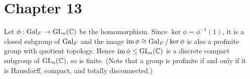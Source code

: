 \newpage
\section{Chapter 13}

\begin{problem} \notfinish
\end{problem}

\begin{problem} \notfinish
\end{problem}

\begin{problem} \notfinish
\end{problem}

\begin{problem}
Let $\phi : \operatorname{\mathrm{Gal}}_F \to \operatorname{\mathrm{GL}}_n(\mathbb{C})$ be the homomorphism.
Since $\ker \phi = \phi^{-1}(1)$, it is a closed subgroup of $\operatorname{\mathrm{Gal}}_F$ and the image $\mathrm{im\,}\phi \cong \operatorname{\mathrm{Gal}}_F / \ker \phi$
is also a profinite group with quotient topology.
Hence $\mathrm{im\,}\phi \leq \operatorname{\mathrm{GL}}_n(\mathbb{C})$ is a discrete compact subgroup of $\operatorname{\mathrm{GL}}_n(\mathbb{C})$, so is finite.
(Note that a group is profinite if and only if it is Hausdorff, compact, and totally disconnected.)
\end{problem}

\begin{problem} \notfinish
\end{problem}
